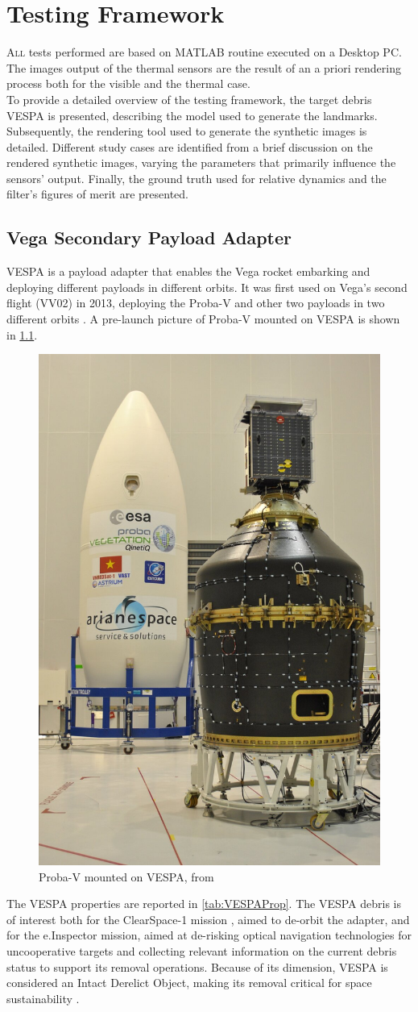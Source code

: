 \chapter{Testing Framework}
\label{sec:testing}
\lettrine{A}{ll} tests performed are based on MATLAB routine executed on a Desktop PC. The images output of the thermal sensors are the result of an a priori rendering process both for the visible and the thermal case.\\
To provide a detailed overview of the testing framework, the target debris VESPA \cite{esa_vv02} is presented, describing the model used to generate the landmarks. Subsequently, the rendering tool used to generate the synthetic images is detailed. Different study cases are identified from a brief discussion on the rendered synthetic images, varying the parameters that primarily influence the sensors' output. Finally, the ground truth used for relative dynamics and the filter's figures of merit are presented. 

\section{Vega Secondary Payload Adapter}
VESPA is a payload adapter that enables the Vega rocket embarking and deploying different payloads in different orbits. It was first used on Vega's second flight (VV02) in 2013, deploying the Proba-V and other two payloads in two different orbits \cite{esa_vv02}. A pre-launch picture of Proba-V mounted on VESPA is shown in \cref{fig:probavespa}.\\
\begin{figure}[H]
    \centering
    \includegraphics[width = 0.275\linewidth]{Images/Proba-V_on_Vespa_adapter_article.jpg}
    \caption{Proba-V mounted on VESPA, from \cite{esa_vv02}}
    \label{fig:probavespa}
\end{figure}

The VESPA properties are reported in \cref{tab:VESPAProp}. The VESPA debris is of interest both for the ClearSpace-1 mission \cite{biesbroek2021clearspace}, aimed to de-orbit the adapter, and for the e.Inspector mission, aimed at de-risking optical navigation technologies for uncooperative targets and collecting relevant information on the current debris status to support its removal operations. Because of its dimension, VESPA is considered an Intact Derelict Object, making its removal critical for space sustainability \cite{liou2012active}. 

